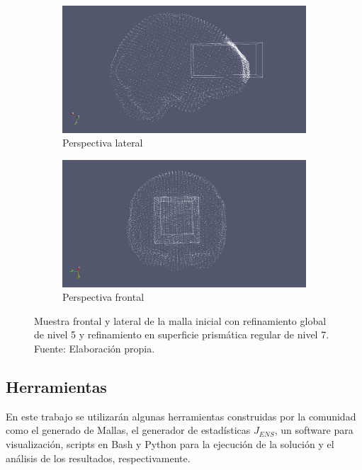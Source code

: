 \begin{figure}[!ht]
    \centering
    \begin{subfigure}[t]{0.45\textwidth}
        \includegraphics[width=1.0\textwidth]{figures/bad_quality_zone/cortex_surf.png}
        \caption{Perspectiva lateral}
    \end{subfigure}
    \begin{subfigure}[t]{0.45\textwidth}
        \includegraphics[width=1.0\textwidth]{figures/bad_quality_zone/cortex_surf_points.png}
        \caption{Perspectiva frontal}
    \end{subfigure}
    \caption{  Muestra frontal y lateral de la malla inicial con refinamiento global de nivel 5 y refinamiento en superficie prismática regular de nivel 7.\\ Fuente: Elaboración propia.}
    \label{fig:cortex_surf}
\end{figure}

\subsection{Herramientas}

En este trabajo se utilizarán algunas herramientas construidas por la comunidad como el generado de Mallas, el generador de estadísticas $J_{ENS}$, un software para visualización, scripts en Bash y Python para la ejecución de la solución y el análisis de los resultados, respectivamente.

